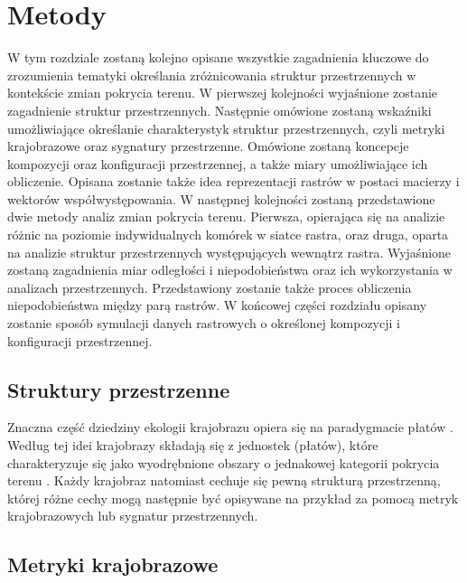 \documentclass{amuthesis}
\begin{document}

\hypertarget{sec-metody}{%
\chapter{Metody}\label{sec-metody}}

W tym rozdziale zostaną kolejno opisane wszystkie zagadnienia kluczowe
do zrozumienia tematyki określania zróżnicowania struktur przestrzennych
w kontekście zmian pokrycia terenu. W pierwszej kolejności wyjaśnione
zostanie zagadnienie struktur przestrzennych. Następnie omówione zostaną
wskaźniki umożliwiające określanie charakterystyk struktur
przestrzennych, czyli metryki krajobrazowe oraz sygnatury przestrzenne.
Omówione zostaną koncepcje kompozycji oraz konfiguracji przestrzennej, a
także miary umożliwiające ich obliczenie. Opisana zostanie także idea
reprezentacji rastrów w postaci macierzy i wektorów współwystępowania. W
następnej kolejności zostaną przedstawione dwie metody analiz zmian
pokrycia terenu. Pierwsza, opierająca się na analizie różnic na poziomie
indywidualnych komórek w siatce rastra, oraz druga, oparta na analizie
struktur przestrzennych występujących wewnątrz rastra. Wyjaśnione
zostaną zagadnienia miar odległości i niepodobieństwa oraz ich
wykorzystania w analizach przestrzennych. Przedstawiony zostanie także
proces obliczenia niepodobieństwa między parą rastrów. W końcowej części
rozdziału opisany zostanie sposób symulacji danych rastrowych o
określonej kompozycji i konfiguracji przestrzennej.

\hypertarget{struktury-przestrzenne}{%
\section{Struktury przestrzenne}\label{struktury-przestrzenne}}

Znaczna część dziedziny ekologii krajobrazu opiera się na paradygmacie
płatów \autocite{mcgarigal2009}. Według tej idei krajobrazy składają się
z jednostek (płatów), które charakteryzuje się jako wyodrębnione obszary
o jednakowej kategorii pokrycia terenu
\autocite{forman1995land,solon2002}. Każdy krajobraz natomiast cechuje
się pewną strukturą przestrzenną, której różne cechy mogą następnie być
opisywane na przykład za pomocą metryk krajobrazowych lub sygnatur
przestrzennych.

\hypertarget{metryki-krajobrazowe}{%
\section{Metryki krajobrazowe}\label{metryki-krajobrazowe}}
\end{document}
